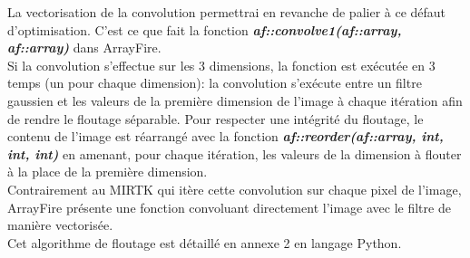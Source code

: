\documentclass[10pt]{report}
\begin{document}
	La vectorisation de la convolution permettrai en revanche de palier à ce défaut d'optimisation. C'est ce que fait la fonction \textbf{\textit{af::convolve1(af::array, af::array)}} dans ArrayFire.\\
	Si la convolution s'effectue sur les 3 dimensions, la fonction est exécutée en 3 temps (un pour chaque dimension): la convolution s'exécute entre un filtre gaussien et les valeurs de la première dimension de l'image à chaque itération afin de rendre le floutage séparable. Pour respecter une intégrité du floutage, le contenu de l'image est réarrangé avec la fonction \textbf{\textit{af::reorder(af::array, int, int, int)}} en amenant, pour chaque itération, les valeurs de la dimension à flouter à la place de la première dimension.\\ 
	Contrairement au MIRTK qui itère cette convolution sur chaque pixel de l'image, ArrayFire présente une fonction convoluant directement l'image avec le filtre de manière vectorisée.\\
	Cet algorithme de floutage est détaillé en annexe 2 en langage Python.
\end{document}
